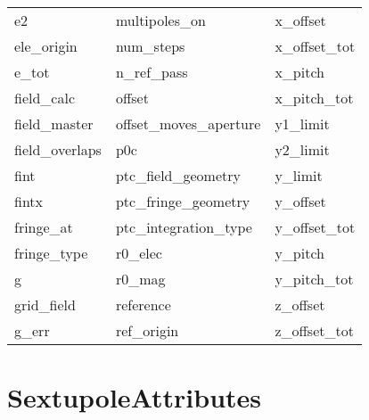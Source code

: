 \begin{tabular}{lll}
e2                          & multipoles_on               & x_offset                    \\
ele_origin                  & num_steps                   & x_offset_tot                \\
e_tot                       & n_ref_pass                  & x_pitch                     \\
field_calc                  & offset                      & x_pitch_tot                 \\
field_master                & offset_moves_aperture       & y1_limit                    \\
field_overlaps              & p0c                         & y2_limit                    \\
fint                        & ptc_field_geometry          & y_limit                     \\
fintx                       & ptc_fringe_geometry         & y_offset                    \\
fringe_at                   & ptc_integration_type        & y_offset_tot                \\
fringe_type                 & r0_elec                     & y_pitch                     \\
g                           & r0_mag                      & y_pitch_tot                 \\
grid_field                  & reference                   & z_offset                    \\
g_err                       & ref_origin                  & z_offset_tot                \\
 \bottomrule
 \end{tabular}
 \vfill
 
 \section{SextupoleAttributes}
 \label{s:list.sextupole}
 
